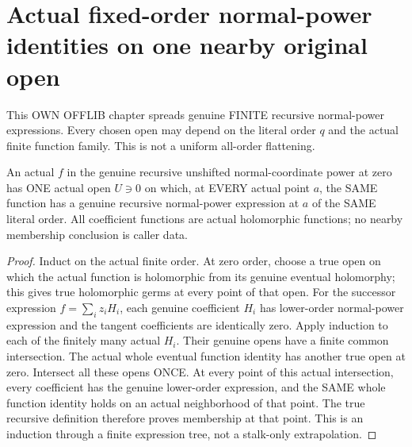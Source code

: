 \section{Actual fixed-order normal-power identities on one nearby original open}
This OWN OFFLIB chapter spreads genuine FINITE recursive normal-power
expressions. Every chosen open may depend on the literal order $q$ and the
actual finite function family. This is not a uniform all-order flattening.

\begin{theorem}
\label{hir:relative-normal-power-spread-actual-recursive-open}
\leanok
{}
An actual $f$ in the genuine recursive unshifted normal-coordinate power
at zero has ONE actual open $U\ni0$ on which, at EVERY actual point $a$,
the SAME function has a genuine recursive normal-power expression at $a$
of the SAME literal order. All coefficient functions are actual holomorphic
functions; no nearby membership conclusion is caller data.
\end{theorem}
\begin{proof}
Induct on the actual finite order. At zero order, choose a true open on
which the actual function is holomorphic from its genuine eventual
holomorphy; this gives true holomorphic germs at every point of that open.
For the successor expression $f=\sum_i z_i H_i$, each genuine coefficient
$H_i$ has lower-order normal-power expression and the tangent coefficients
are identically zero. Apply induction to each of the finitely many actual
$H_i$. Their genuine opens have a finite common intersection. The actual
whole eventual function identity has another true open at zero. Intersect
all these opens ONCE. At every point of this actual intersection, every
coefficient has the genuine lower-order expression, and the SAME whole
function identity holds on an actual neighborhood of that point. The true
recursive definition therefore proves membership at that point. This is an
induction through a finite expression tree, not a stalk-only extrapolation.
\end{proof}

